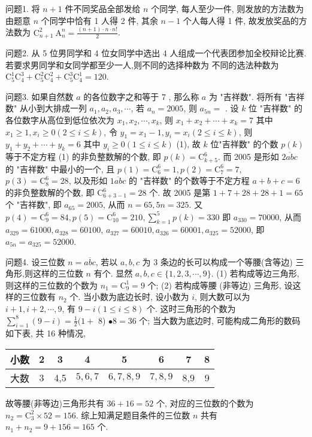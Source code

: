 
问题1. 将 $n+1$ 件不同奖品全部发给 $n$ 个同学, 每人至少一件, 则发放的方法数为
由题意 $n$ 个同学中恰有 1 人得 2 件, 其余 $n-1$ 个人每人得 1 件, 故发放奖品的方法数为 $\mathrm{C}_{n+1}^2 \mathrm{~A}_n^n=\frac{(n+1) \cdot n \cdot n !}{2}$.



问题2. 从 5 位男同学和 4 位女同学中选出 4 人组成一个代表团参加全校辩论比赛.
若要求男同学和女同学都至少一人,则不同的选择种数为
不同的选法种数为 $\mathrm{C}_5^1 \mathrm{C}_4^3+\mathrm{C}_5^2 \mathrm{C}_4^2+\mathrm{C}_5^3 \mathrm{C}_4^1=120$.



问题3. 如果自然数 $a$ 的各位数字之和等于 7 , 那么称 $a$ 为 "吉祥数". 将所有 "吉祥数" 从小到大排成一列 $a_1, a_2, a_3, \cdots$, 若 $a_n=2005$, 则 $a_{5 n}=$ . 
设 $k$ 位 "吉祥数" 的各位数字从高位到低位依次为 $x_1, x_2, \cdots, x_k$, 则 $x_1+x_2+\cdots+x_k=7$ 其中 $x_1 \geqslant 1, x_i \geqslant 0(2 \leqslant i \leqslant k)$, 令 $y_1=x_1-1, y_i= x_i(2 \leqslant i \leqslant k)$, 则 $y_1+y_2+\cdots+y_k=6$ 其中 $y_i \geqslant 0(1 \leqslant i \leqslant k)$ (1), 故 $k$ 位"吉祥数" 的个数 $p(k)$ 等于不定方程 (1) 的非负整数解的个数, 即 $p(k)=\mathrm{C}_{k+5}^6$. 而 2005 是形如 $\overline{2 a b c}$ 的 "吉祥数" 中最小的一个, 且 $p(1)=\mathrm{C}_6^6=1, p(2)=\mathrm{C}_7^6=7$, $p(3)=\mathrm{C}_8^6=28$, 以及形如 $\overline{1 a b c}$ 的 "吉祥数" 的个数等于不定方程 $a+b+c=6$ 的非负整数解的个数, 即 $\mathrm{C}_{6+3-1}^6=28$ 个.
故 2005 是第 $1+7+28+28+1=65$ 个 "吉祥数", 即 $a_{65}=2005$, 从而 $n=65,5 n=325$. 又 $p(4)=\mathrm{C}_9^6=84, p(5)= \mathrm{C}_{10}^6=210, \sum_{k=1}^5 p(k)=330$ 即 $a_{330}=70000$, 从而 $a_{329}=61000, a_{328}=60100$, $a_{327}=60010, a_{326}=60001, a_{325}=52000$, 即 $a_{5 n}=a_{325}=52000$.



问题4. 设三位数 $n=\overline{a b c}$, 若以 $a, b, c$ 为 3 条边的长可以构成一个等腰(含等边) 三角形,则这样的三位数 $n$ 有个.
显然 $a, b, c \in\{1,2,3, \cdots, 9\}$. (1) 若构成等边三角形, 则这样的三位数的个数为 $n_1=\mathrm{C}_9^1=9$ 个; (2) 若构成等腰 (非等边) 三角形, 设这样的三位数有 $n_2$ 个.
当小数为底边长时, 设小数为 $i$, 则大数可以为 $i+1, i+ 2, \cdots, 9$, 有 $9-i(1 \leqslant i \leqslant 8)$ 个.
这时三角形的个数为 $\sum_{i=1}^8(9-i)=\frac{1}{2}(1+$ 8) $\bullet 8=36$ 个; 当大数为底边时, 可能构成二角形的数码如下表, 共 16 种情况,
\begin{tabular}{|c|c|c|c|c|c|c|c|}
\hline 小数 & 2 & 3 & 4 & 5 & 6 & 7 & 8 \\
\hline 大数 & 3 & 4,5 & $5,6,7$ & $6,7,8,9$ & $7,8,9$ & 8,9 & 9 \\
\hline
\end{tabular}
故等腰(非等边)三角形共有 $36+16=52$ 个, 对应的三位数的个数为 $n_2= \mathrm{C}_3^2 \times 52=156$. 综上知满足题目条件的三位数 $n$ 共有 $n_1+n_2=9+156=165$ 个.



